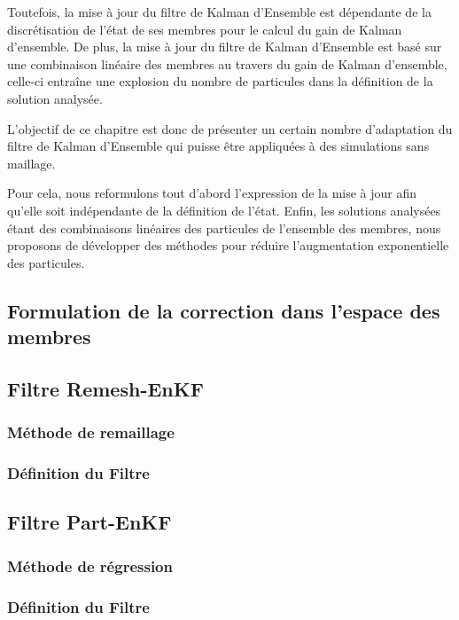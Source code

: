 Toutefois, la mise à jour du filtre de Kalman d'Ensemble est dépendante de la discrétisation de l'état de ses membres pour le calcul du gain de Kalman d'ensemble. De plus, la mise à jour du filtre de Kalman d'Ensemble est basé sur une combinaison linéaire des membres au travers du gain de Kalman d'ensemble, celle-ci entraîne une explosion du nombre de particules dans la définition de la solution analysée.

L'objectif de ce chapitre est donc de présenter un certain nombre d'adaptation du filtre de Kalman d'Ensemble qui puisse être appliquées à des simulations sans maillage.

Pour cela, nous reformulons tout d'abord l'expression de la mise à jour afin qu'elle soit indépendante de la définition de l'état.
Enfin, les solutions analysées étant des combinaisons linéaires des particules de l'ensemble des membres, nous proposons de développer des méthodes pour réduire l'augmentation exponentielle des particules.

\subsection{Formulation de la correction dans l'espace des membres}

\subsection{Filtre Remesh-EnKF}
\subsubsection{Méthode de remaillage}
\subsubsection{Définition du Filtre}
\subsection{Filtre Part-EnKF}
\subsubsection{Méthode de régression}
\subsubsection{Définition du Filtre}

\subsubsection{}

